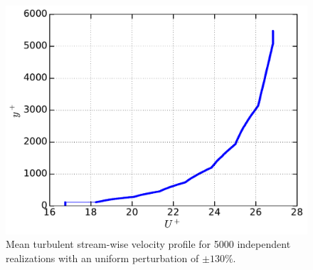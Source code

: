 \documentclass[aps,reprint,amsmath,amssymb,pra]{revtex4-1}%
\begin{document}
\begin{figure}[tbh]
\includegraphics[scale=0.45]{figures/Master_averaged_step_profile_5000_assembles_un130}
\caption{\label{fig:mp_un130} Mean turbulent stream-wise velocity profile for 5000 independent realizations with an uniform perturbation of $\pm 130\%$.}
\end{figure}
\end{document}
